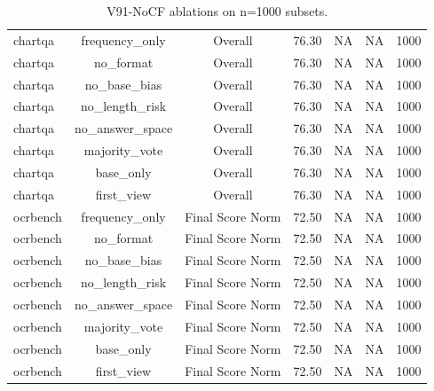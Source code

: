 \begin{table}[t]
\begin{tabular}{lcccccc}
chartqa & frequency_only & Overall & 76.30 & NA & NA & 1000 \\
chartqa & no_format & Overall & 76.30 & NA & NA & 1000 \\
chartqa & no_base_bias & Overall & 76.30 & NA & NA & 1000 \\
chartqa & no_length_risk & Overall & 76.30 & NA & NA & 1000 \\
chartqa & no_answer_space & Overall & 76.30 & NA & NA & 1000 \\
chartqa & majority_vote & Overall & 76.30 & NA & NA & 1000 \\
chartqa & base_only & Overall & 76.30 & NA & NA & 1000 \\
chartqa & first_view & Overall & 76.30 & NA & NA & 1000 \\
ocrbench & frequency_only & Final Score Norm & 72.50 & NA & NA & 1000 \\
ocrbench & no_format & Final Score Norm & 72.50 & NA & NA & 1000 \\
ocrbench & no_base_bias & Final Score Norm & 72.50 & NA & NA & 1000 \\
ocrbench & no_length_risk & Final Score Norm & 72.50 & NA & NA & 1000 \\
ocrbench & no_answer_space & Final Score Norm & 72.50 & NA & NA & 1000 \\
ocrbench & majority_vote & Final Score Norm & 72.50 & NA & NA & 1000 \\
ocrbench & base_only & Final Score Norm & 72.50 & NA & NA & 1000 \\
ocrbench & first_view & Final Score Norm & 72.50 & NA & NA & 1000 \\
\bottomrule
\end{tabular}
\caption{V91-NoCF ablations on n=1000 subsets.}
\label{tab:nocf_ablation_n1000}
\end{table}
